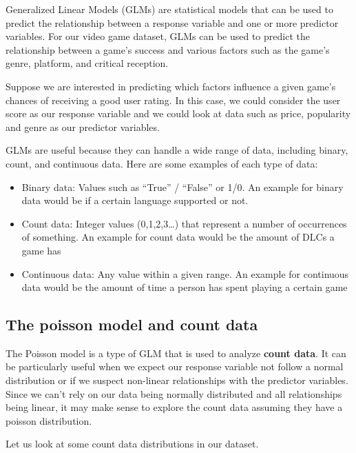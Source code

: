 \documentclass[
]{article}
\providecommand{\tightlist}{%
  \setlength{\itemsep}{0pt}\setlength{\parskip}{0pt}}
\begin{document}
Generalized Linear Models (GLMs) are statistical models that can be used
to predict the relationship between a response variable and one or more
predictor variables. For our video game dataset, GLMs can be used to
predict the relationship between a game's success and various factors
such as the game's genre, platform, and critical reception.

Suppose we are interested in predicting which factors influence a given
game's chances of receiving a good user rating. In this case, we could
consider the user score as our response variable and we could look at
data such as price, popularity and genre as our predictor variables.

GLMs are useful because they can handle a wide range of data, including
binary, count, and continuous data. Here are some examples of each type
of data:

\begin{itemize}
\tightlist
\item
  Binary data: Values such as ``True'' / ``False'' or 1/0. An example
  for binary data would be if a certain language supported or not.
\item
  Count data: Integer values (0,1,2,3\ldots) that represent a number of
  occurrences of something. An example for count data would be the
  amount of DLCs a game has
\item
  Continuous data: Any value within a given range. An example for
  continuous data would be the amount of time a person has spent playing
  a certain game
\end{itemize}

\hypertarget{the-poisson-model-and-count-data}{%
\subsection{The poisson model and count
data}\label{the-poisson-model-and-count-data}}

The Poisson model is a type of GLM that is used to analyze \textbf{count
data}. It can be particularly useful when we expect our response
variable not follow a normal distribution or if we suspect non-linear
relationships with the predictor variables. Since we can't rely on our
data being normally distributed and all relationships being linear, it
may make sense to explore the count data assuming they have a poisson
distribution.

Let us look at some count data distributions in our dataset.
\end{document}
